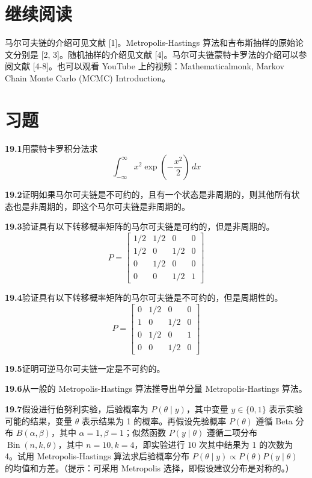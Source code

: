 \documentclass[UTF8,12pt,a4paper,fontset=fandol]{ctexart}
\begin{document}
\section*{继续阅读}

马尔可夫链的介绍可见文献 [1]。Metropolis-Hastings 算法和吉布斯抽样的原始论文分别是 [2, 3]。随机抽样的介绍见文献 [4]。马尔可夫链蒙特卡罗法的介绍可以参阅文献 [4-8]。也可以观看 YouTube 上的视频：Mathematicalmonk, Markov Chain Monte Carlo (MCMC) Introduction。

\section*{习题}

\noindent\textbf{19.1}\quad 用蒙特卡罗积分法求
\[
\int_{-\infty}^{\infty}x^2\exp\left(-\frac{x^2}{2}\right)\,dx
\]

\noindent\textbf{19.2}\quad 证明如果马尔可夫链是不可约的，且有一个状态是非周期的，则其他所有状态也是非周期的，即这个马尔可夫链是非周期的。

\noindent\textbf{19.3}\quad 验证具有以下转移概率矩阵的马尔可夫链是可约的，但是非周期的。
\[
P=
\begin{bmatrix}
1/2 & 1/2 & 0 & 0\\
1/2 & 0 & 1/2 & 0\\
0 & 1/2 & 0 & 0\\
0 & 0 & 1/2 & 1
\end{bmatrix}
\]

\noindent\textbf{19.4}\quad 验证具有以下转移概率矩阵的马尔可夫链是不可约的，但是周期性的。
\[
P=
\begin{bmatrix}
0 & 1/2 & 0 & 0\\
1 & 0 & 1/2 & 0\\
0 & 1/2 & 0 & 1\\
0 & 0 & 1/2 & 0
\end{bmatrix}
\]

\noindent\textbf{19.5}\quad 证明可逆马尔可夫链一定是不可约的。

\noindent\textbf{19.6}\quad 从一般的 Metropolis-Hastings 算法推导出单分量 Metropolis-Hastings 算法。

\noindent\textbf{19.7}\quad 假设进行伯努利实验，后验概率为 $P(\theta\mid y)$，其中变量 $y\in\{0,1\}$ 表示实验可能的结果，变量 $\theta$ 表示结果为 1 的概率。再假设先验概率 $P(\theta)$ 遵循 Beta 分布 $B(\alpha,\beta)$，其中 $\alpha=1,\beta=1$；似然函数 $P(y\mid\theta)$ 遵循二项分布 $\operatorname{Bin}(n,k,\theta)$，其中 $n=10,k=4$，即实验进行 10 次其中结果为 1 的次数为 4。试用 Metropolis-Hastings 算法求后验概率分布 $P(\theta\mid y)\propto P(\theta)P(y\mid\theta)$ 的均值和方差。（提示：可采用 Metropolis 选择，即假设建议分布是对称的。）
\end{document}
